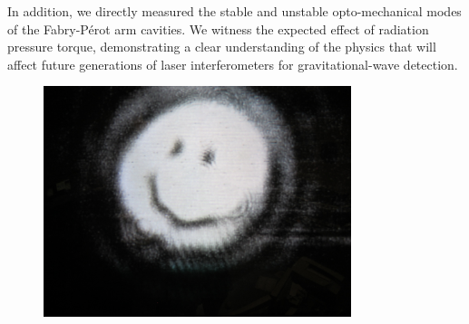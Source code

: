 In addition, we directly measured the stable and unstable
opto-mechanical modes of the Fabry-P\'{e}rot arm cavities. We witness
the expected effect of radiation pressure torque, demonstrating a
clear understanding of the physics that will affect future generations
of laser interferometers for gravitational-wave detection.


\begin{figure}
\begin{centering}
\includegraphics[width=0.8\textwidth]{figures/PMCRefl_smiley.JPG}
\label{fig:smiley}
\end{centering}
\end{figure}


